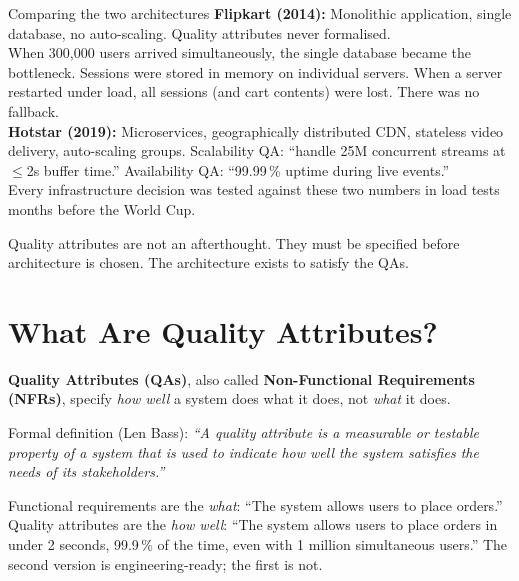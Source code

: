 \documentclass[a4paper,11pt]{article}
\newcommand{\vocab}[1]{\textbf{\color{navy}#1}}
\begin{document}
\begin{worked}{Comparing the two architectures}
\textbf{Flipkart (2014):} Monolithic application, single database, no auto-scaling. Quality attributes never formalised. \\
When 300{,}000 users arrived simultaneously, the single database became the bottleneck. Sessions were stored in memory on individual servers. When a server restarted under load, all sessions (and cart contents) were lost. There was no fallback. \\[4pt]
\textbf{Hotstar (2019):} Microservices, geographically distributed CDN, stateless video delivery, auto-scaling groups. Scalability QA: ``handle 25M concurrent streams at $\leq$2s buffer time.'' Availability QA: ``99.99\,\% uptime during live events.'' \\
Every infrastructure decision was tested against these two numbers in load tests months before the World Cup.
\end{worked}

\begin{keytake}
Quality attributes are not an afterthought. They must be specified before architecture is chosen. The architecture exists to satisfy the QAs.
\end{keytake}

\section{What Are Quality Attributes?}

\vocab{Quality Attributes (QAs)}, also called \vocab{Non-Functional Requirements (NFRs)}, specify \emph{how well} a system does what it does, not \emph{what} it does.

Formal definition (Len Bass): \emph{``A quality attribute is a measurable or testable property of a system that is used to indicate how well the system satisfies the needs of its stakeholders.''}

\begin{intuition}
Functional requirements are the \emph{what}: ``The system allows users to place orders.'' Quality attributes are the \emph{how well}: ``The system allows users to place orders in under 2 seconds, 99.9\,\% of the time, even with 1 million simultaneous users.'' The second version is engineering-ready; the first is not.
\end{intuition}
\end{document}
